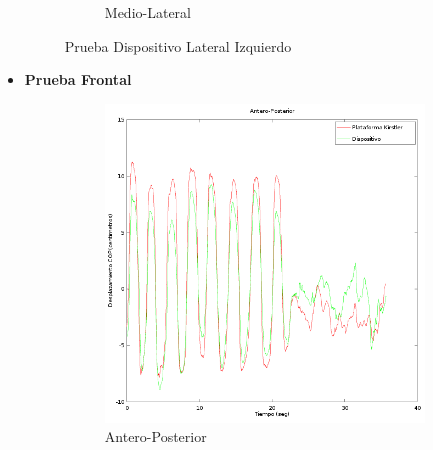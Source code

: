 \documentclass[12pt,a4paper]{article}
\begin{document}
\begin{itemize}
\begin{figure}[H]
\begin{subfigure}{.5\textwidth}
			\caption{Medio-Lateral}
			\label{fig:medioLateralIzquierdo}
		\end{subfigure}
		\caption{Prueba Dispositivo Lateral Izquierdo}
		\label{fig:pruebaLateralIzquierdo}
	\end{figure}
	
	
	\item \textbf{Prueba Frontal}
	\begin{figure}[H]
		\centering
		\begin{subfigure}{.5\textwidth}
			\centering
			\includegraphics[width=1\linewidth]{images/pruebas/Frontal/Antero-Posterior}
			\caption{Antero-Posterior}
			\label{fig:anteroPosterioFrontal}
		\end{subfigure}%
		\begin{subfigure}{.5\textwidth}
			\centering

\end{subfigure}
\end{figure}
\end{itemize}
\end{document}
